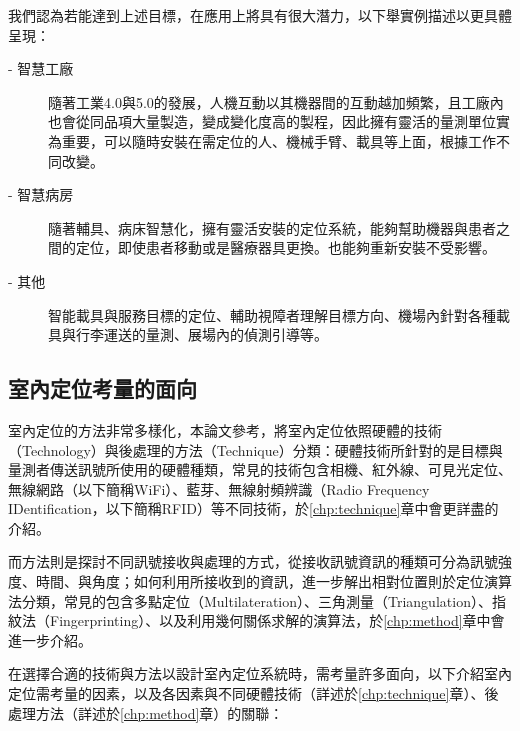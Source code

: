 \hfill

我們認為若能達到上述目標，在應用上將具有很大潛力，以下舉實例描述以更具體呈現：
\begin{description}
    \item[- 智慧工廠] \hfill 
    
    \quad \quad 
    隨著工業4.0與5.0的發展，人機互動以其機器間的互動越加頻繁，且工廠內也會從同品項大量製造，變成變化度高的製程，因此擁有靈活的量測單位實為重要，可以隨時安裝在需定位的人、機械手臂、載具等上面，根據工作不同改變。

    \item[- 智慧病房] \hfill 
    
    \qquad
    隨著輔具、病床智慧化，擁有靈活安裝的定位系統，能夠幫助機器與患者之間的定位，即使患者移動或是醫療器具更換。也能夠重新安裝不受影響。
    
    \item[- 其他]  \hfill 
    
    \qquad
    智能載具與服務目標的定位、輔助視障者理解目標方向、機場內針對各種載具與行李運送的量測、展場內的偵測引導等。
\end{description}









\subsection{室內定位考量的面向}
\label{chp:intro}




室內定位的方法非常多樣化，本論文參考\cite{survey_indoor2018}，將室內定位依照硬體的技術（Technology）與後處理的方法（Technique）分類：硬體技術所針對的是目標與量測者傳送訊號所使用的硬體種類，常見的技術包含相機、紅外線、可見光定位、無線網路（以下簡稱WiFi）、藍芽、無線射頻辨識（Radio Frequency IDentification，以下簡稱RFID）等不同技術，於\ref{chp:technique}章中會更詳盡的介紹。

而方法則是探討不同訊號接收與處理的方式，從接收訊號資訊的種類可分為訊號強度、時間、與角度；如何利用所接收到的資訊，進一步解出相對位置則於定位演算法分類，常見的包含多點定位（Multilateration）、三角測量（Triangulation）、指紋法（Fingerprinting）、以及利用幾何關係求解的演算法，於\ref{chp:method}章中會進一步介紹。


在選擇合適的技術與方法以設計室內定位系統時，需考量許多面向，以下介紹室內定位需考量的因素，以及各因素與不同硬體技術（詳述於\ref{chp:technique}章）、後處理方法（詳述於\ref{chp:method}章）的關聯：

